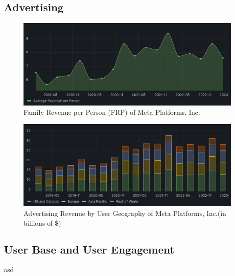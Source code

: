 \documentclass[12pt, a4paper]{article}
\begin{document}
\subsection*{Advertising}

\begin{figure}[h]
    \centering
    \includegraphics[width=1.00\textwidth]{family-revenue-per-person}
    \caption{Family Revenue per Person (FRP) of Meta Platforms,
    Inc.\cite{2023q1,2021q2Slides,2019q4Slides}}
    \label{fig:family-revenue-per-person}
\end{figure}

\begin{figure}[h]
    \centering
    \includegraphics[width=1.00\textwidth]{advertising-revenue-by-user-geography}
    \caption{Advertising Revenue by User Geography of Meta Platforms, Inc.(in
    billions of \$)\cite{2023q1,2021q2Slides,2019q4Slides}}
    \label{fig:advertising-revenue-by-user-geography}
\end{figure}


\subsection*{User Base and User Engagement}

asd
\end{document}
